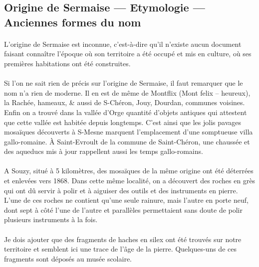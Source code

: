 \documentclass[../eBook.tex]{subfiles}
\begin{document}
  \subsection*{Origine de Sermaise --- Etymologie --- Anciennes formes du nom}
    \paragraph{}L'origine de Sermaise est inconnue, c'est-à-dire qu'il n'existe aucun document faisant connaître l'époque où son territoire a été occupé et mis en culture, où ses premières habitations ont été construites.
    \paragraph{}Si l'on ne sait rien de précis sur l'origine de Sermaise, il faut remarquer que le nom n'a rien de moderne. Il en est de même de Montflix (Mont felix -- heureux), la Rachée, hameaux, \& aussi de S-Chéron, Jouy, Dourdan, communes voisines. Enfin on a trouvé dans la vallée d'Orge quantité d'objets antiques qui attestent que cette vallée est habitée depuis longtemps. C'est ainsi que les jolis pavages mosaïques découverts à S-Mesne marquent l'emplacement d'une somptueuse villa gallo-romaine. À Saint-Evroult de la commune de Saint-Chéron, une chaussée et des aqueducs mis à jour rappellent aussi les temps gallo-romains.
    \paragraph{}A Souzy, situé à 5 kilomètres, des mosaïques de la même origine ont été déterrées et enlevées vers 1868. Dans cette même localité, on a découvert des roches en grès qui ont dû servir à polir et à aiguiser des outils et des instruments en pierre. L'une de ces roches ne contient qu'une seule rainure, mais l'autre en porte neuf, dont sept à côté l'une de l'autre et parallèles permettaient sans doute de polir plusieurs instruments à la fois.
    \paragraph{}Je dois ajouter que des fragments de haches en silex ont été trouvés sur notre territoire et semblent ici une trace de l'âge de la pierre. Quelques-uns de ces fragments sont déposés au musée scolaire.
\end{document}

